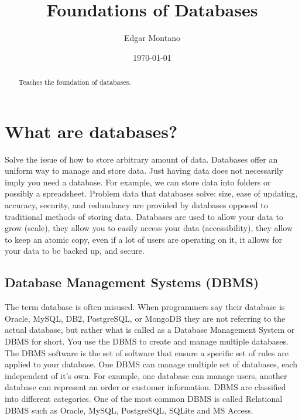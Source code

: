 \documentclass[a4paper]{article}
\title{Foundations of Databases}
\author{Edgar Montano}
\date{\today}
\begin{document}
\maketitle

\begin{abstract}
Teaches the foundation of databases.
\end{abstract}

\section{What are databases?}
\par{Solve the issue of how to store arbitrary amount of data. Databases offer an uniform way to manage and store data. Just having data does not necessarily imply you need a database. For example, we can store data into folders or possibly a spreadsheet.  Problem data that databases solve: size, ease of updating, accuracy, security, and redundancy are provided by databases opposed to traditional methods of storing data.  Databases are used to allow your data to grow (scale), they allow you to easily access your data (accessibility), they allow to keep an atomic copy, even if a lot of users are operating on it, it allows for your data to be backed up, and secure.}

\subsection{Database Management Systems (DBMS)}
\par{The term database is often misused. When programmers say their database is Oracle, MySQL, DB2, PostgreSQL, or MongoDB they are not referring to the actual database, but rather what is called as a Database Management System or DBMS for short. You use the DBMS to create and manage multiple databases. The DBMS software is the set of software that ensure a specific set of rules are applied to your database. One DBMS can manage multiple set of databases, each independent of it's own. For example, one database can manage users, another database can represent an order or customer information. DBMS are classified into different categories. One of the most common DBMS is called Relational DBMS such as Oracle, MySQL, PostgreSQL, SQLite and MS Access. }
\end{document}
